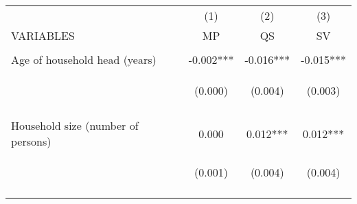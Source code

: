 \begin{center}
\begin{tabular}{lccc} \hline
 & (1) & (2) & (3) \\
VARIABLES & MP & QS & SV \\ \hline
\vspace{4pt} & \begin{footnotesize}\end{footnotesize} & \begin{footnotesize}\end{footnotesize} & \begin{footnotesize}\end{footnotesize} \\
Age of household head (years) & -0.002*** & -0.016*** & -0.015*** \\
 & \begin{footnotesize}(0.000)\end{footnotesize} & \begin{footnotesize}(0.004)\end{footnotesize} & \begin{footnotesize}(0.003)\end{footnotesize} \\
\vspace{4pt} & \begin{footnotesize}[0.001]\end{footnotesize} & \begin{footnotesize}[0.000]\end{footnotesize} & \begin{footnotesize}[0.000]\end{footnotesize} \\
Household size (number of persons) & 0.000 & 0.012*** & 0.012*** \\
 & \begin{footnotesize}(0.001)\end{footnotesize} & \begin{footnotesize}(0.004)\end{footnotesize} & \begin{footnotesize}(0.004)\end{footnotesize} \\
\vspace{4pt} & \begin{footnotesize}[0.409]\end{footnotesize} & \begin{footnotesize}[0.002]\end{footnotesize} & \begin{footnotesize}[0.001]\end{footnotesize} \\

\end{tabular}
\end{center}
